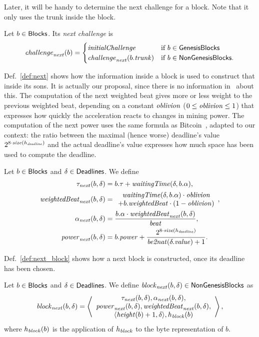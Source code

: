 Later, it will be handy to determine the next challenge for a block. Note that
it only uses the trunk inside the block.
%
\begin{definition}\label{def:next_challenge_from_block}
  Let $b\in{\mathsf{Blocks}}$. Its \emph{next challenge} is
  \[
  {\mathit{challenge}}_{\mathit{next}}(b)=\begin{cases}
  {\mathit{initialChallenge}} & \text{if $b\in{\mathsf{GenesisBlocks}}$}\\
  {\mathit{challenge}}_{\mathit{next}}(b.{\mathit{trunk}}) & \text{if $b\in{\mathsf{NonGenesisBlocks}}$.}
  \end{cases}
  \]
\end{definition}

Def.~\ref{def:next} shows how the information inside a block is used to construct
that inside its sons. It is actually our proposal, since there is no information
in~\cite{SignumPlotting} about this. The computation of the next weighted beat
gives more or less weight to the previous weighted beat, depending on a constant ${\mathit{oblivion}}$
($0\le{\mathit{oblivion}}\le 1$) that expresses how quickly the acceleration reacts to changes
in mining power. The computation of the next power uses the same formula
as Bitcoin~\cite{WalkerG24}, adapted to our context: the ratio between the maximal (hence worse)
deadline's value $2^{8\cdot{\mathit{size}}(h_{\mathit{deadline}})}$ and the actual deadline's value
expresses how much space has been used to compute the deadline.
%
\begin{definition}\label{def:next}
  Let $b\in{\mathsf{Blocks}}$ and $\delta\in{\mathsf{Deadlines}}$. We define
  \begin{align*}
    \tau_{\mathit{next}}(b,\delta)&=b.\tau+{\mathit{waitingTime}}(\delta,b.\alpha),\\
    \mathit{weightedBeat}_{\mathit{next}}(b,\delta)&=\begin{array}{c}
    {\mathit{waitingTime}}(\delta,b.\alpha)\cdot{\mathit{oblivion}}\\
    +b.\mathit{weightedBeat}\cdot(1-{\mathit{oblivion}})
    \end{array},\\
    \alpha_{\mathit{next}}(b,\delta)&=\frac{b.\alpha\cdot\mathit{weightedBeat}_{\mathit{next}}(b,\delta)}{{\mathit{beat}}},\\
    {\mathit{power}}_{\mathit{next}}(b,\delta)&=b.{\mathit{power}}+\frac{2^{8\cdot{\mathit{size}}(h_{\mathit{deadline}})}}{{\mathit{be2nat}}(\delta.\mathit{value})+1}.
  \end{align*}
\end{definition}
%
Def.~\ref{def:next_block} shows how a next block is constructed, once
its deadline has been chosen.
%
\begin{definition}\label{def:next_block}
  Let $b\in{\mathsf{Blocks}}$ and $\delta\in{\mathsf{Deadlines}}$. We define
  ${\mathit{block}}_{\mathit{next}}(b,\delta)\in{\mathsf{NonGenesisBlocks}}$ as
  \[
  {\mathit{block}}_{\mathit{next}}(b,\delta)=\left\langle\begin{array}{c}
  \tau_{\mathit{next}}(b,\delta),\alpha_{\mathit{next}}(b,\delta),\\
  {\mathit{power}}_{\mathit{next}}(b,\delta),\mathit{weightedBeat}_{\mathit{next}}(b,\delta),\\
  \langle{\mathit{height}}(b)+1,\delta\rangle,h_{\mathit{block}}(b)
  \end{array}\right\rangle,
  \]
  where $h_{\mathit{block}}(b)$ is the application of $h_{\mathit{block}}$ to the byte representation of $b$.
\end{definition}

